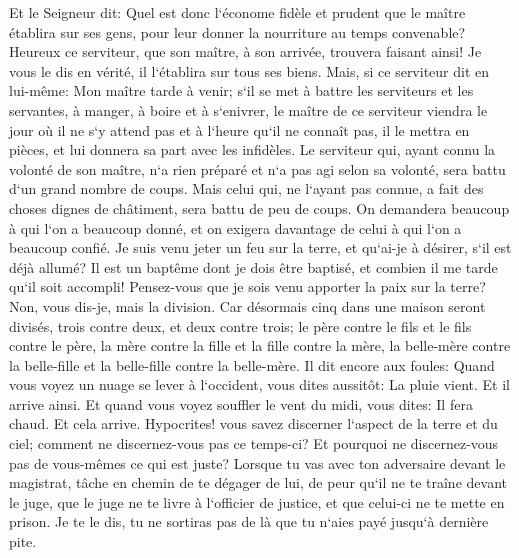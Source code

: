\verse Et le Seigneur dit: Quel est donc l`économe fidèle et prudent que le maître établira sur ses gens, pour leur donner la nourriture au temps convenable? 
\verse Heureux ce serviteur, que son maître, à son arrivée, trouvera faisant ainsi! 
\verse Je vous le dis en vérité, il l`établira sur tous ses biens. 
\verse Mais, si ce serviteur dit en lui-même: Mon maître tarde à venir; s`il se met à battre les serviteurs et les servantes, à manger, à boire et à s`enivrer, 
\verse le maître de ce serviteur viendra le jour où il ne s`y attend pas et à l`heure qu`il ne connaît pas, il le mettra en pièces, et lui donnera sa part avec les infidèles. 
\verse Le serviteur qui, ayant connu la volonté de son maître, n`a rien préparé et n`a pas agi selon sa volonté, sera battu d`un grand nombre de coups. 
\verse Mais celui qui, ne l`ayant pas connue, a fait des choses dignes de châtiment, sera battu de peu de coups. On demandera beaucoup à qui l`on a beaucoup donné, et on exigera davantage de celui à qui l`on a beaucoup confié. 
\verse Je suis venu jeter un feu sur la terre, et qu`ai-je à désirer, s`il est déjà allumé? 
\verse Il est un baptême dont je dois être baptisé, et combien il me tarde qu`il soit accompli! 
\verse Pensez-vous que je sois venu apporter la paix sur la terre? Non, vous dis-je, mais la division. 
\verse Car désormais cinq dans une maison seront divisés, trois contre deux, et deux contre trois; 
\verse le père contre le fils et le fils contre le père, la mère contre la fille et la fille contre la mère, la belle-mère contre la belle-fille et la belle-fille contre la belle-mère. 
\verse Il dit encore aux foules: Quand vous voyez un nuage se lever à l`occident, vous dites aussitôt: La pluie vient. Et il arrive ainsi. 
\verse Et quand vous voyez souffler le vent du midi, vous dites: Il fera chaud. Et cela arrive. 
\verse Hypocrites! vous savez discerner l`aspect de la terre et du ciel; comment ne discernez-vous pas ce temps-ci? 
\verse Et pourquoi ne discernez-vous pas de vous-mêmes ce qui est juste? 
\verse Lorsque tu vas avec ton adversaire devant le magistrat, tâche en chemin de te dégager de lui, de peur qu`il ne te traîne devant le juge, que le juge ne te livre à l`officier de justice, et que celui-ci ne te mette en prison. 
\verse Je te le dis, tu ne sortiras pas de là que tu n`aies payé jusqu`à dernière pite. 

\chapter{}

